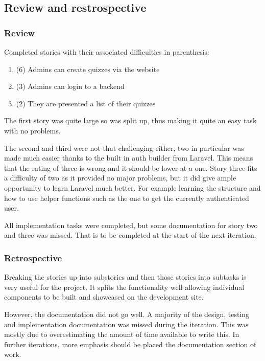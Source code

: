 \subsection{Review and restrospective}
\subsubsection{Review}
Completed stories with their associated difficulties in parenthesis:
\begin{enumerate}
	\item (6) Admins can create quizzes via the website
	\item (3) Admins can login to a backend
	\item (2) They are presented a list of their quizzes
\end{enumerate}
The first story was quite large so was split up, thus making it quite an easy task with no problems.

The second and third were not that challenging either, two in particular was made much easier thanks to the built in auth builder from Laravel. This means that the rating of three is wrong and it should be lower at a one. Story three fits a difficulty of two as it provided no major problems, but it did give ample opportunity to learn Laravel much better. For example learning the structure and how to use helper functions such as the one to get the currently authenticated user.

All implementation tasks were completed, but some documentation for story two and three was missed. That is to be completed at the start of the next iteration.

\subsubsection{Retrospective}
Breaking the stories up into substories and then those stories into subtasks is very useful for the project. It splits the functionality well allowing individual components to be built and showcased on the development site.

However, the documentation did not go well. A majority of the design, testing and implementation documentation was missed during the iteration. This was mostly due to overestimating the amount of time available to write this. In further iterations, more emphasis should be placed the documentation section of work.
\newpage
